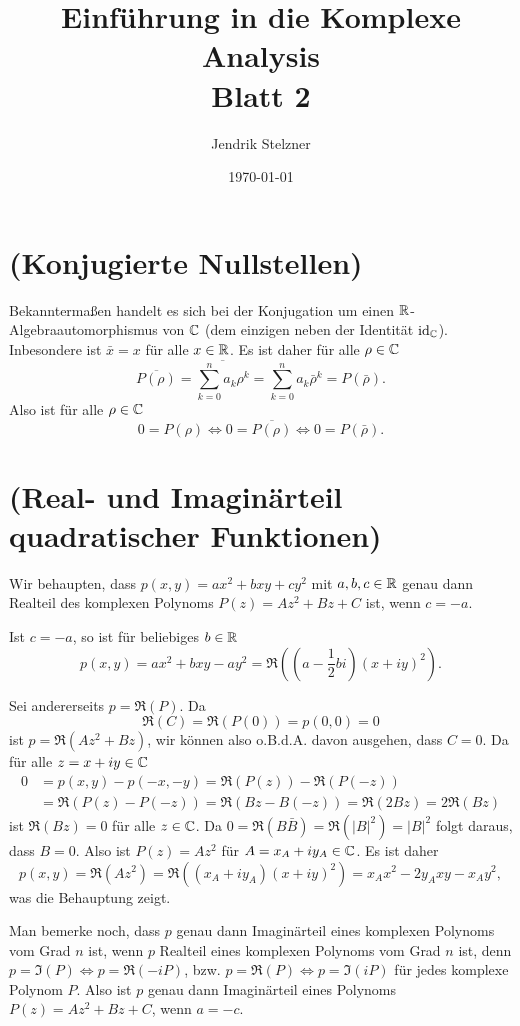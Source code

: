 \documentclass[a4paper,10pt]{article}
\title{\sc Einführung in die Komplexe Analysis \\ \Large Blatt 2}
\author{Jendrik Stelzner}
\date{\today}
\begin{document}
\maketitle





\section{(Konjugierte Nullstellen)}
Bekanntermaßen handelt es sich bei der Konjugation um einen $\mathbb{R}$-Algebraauto\-morph\-ismus von $\mathbb{C}$ (dem einzigen neben der Identität $\operatorname{id}_{\mathbb{C}}$). Inbesondere ist $\bar{x} = x$ für alle $x \in \mathbb{R}$. Es ist daher für alle $\rho \in \mathbb{C}$
\[
 \overline{P(\rho)} = \overline{\sum_{k=0}^n a_k \rho^k} = \sum_{k=0}^n a_k \bar{\rho}^k = P(\bar{\rho}).
\]
Also ist für alle $\rho \in \mathbb{C}$
\[
 0 = P(\rho) \Leftrightarrow 0 = \overline{P(\rho)} \Leftrightarrow 0 = P(\bar{\rho}).
\]





\addtocounter{section}{1}





\section{(Real- und Imaginärteil quadratischer Funktionen)}
Wir behaupten, dass $p(x,y) = ax^2 + bxy + cy^2$ mit $a,b,c \in \mathbb{R}$ genau dann Realteil des komplexen Polynoms $P(z) = Az^2 + Bz + C$ ist, wenn $c = -a$.

Ist $c = -a$, so ist für beliebiges $b \in \mathbb{R}$
\[
 p(x,y) = ax^2 + bxy - ay^2 = \Re\left(\left(a-\frac{1}{2}bi\right)(x+iy)^2\right).
\]

Sei andererseits $p = \Re(P)$. Da
\[
 \Re(C) = \Re(P(0)) = p(0,0) = 0
\]
ist $p = \Re(Az^2+Bz)$, wir können also o.B.d.A. davon ausgehen, dass $C=0$. Da für alle $z = x+iy \in \mathbb{C}$
\begin{align*}
 0 &= p(x,y) - p(-x,-y) = \Re(P(z))-\Re(P(-z)) \\
   &= \Re(P(z)-P(-z)) = \Re(Bz - B(-z)) = \Re(2Bz) = 2 \Re(Bz)
\end{align*}
ist $\Re(Bz) = 0$ für alle $z \in \mathbb{C}$. Da $0 = \Re(B \bar{B}) = \Re(|B|^2)= |B|^2$ folgt daraus, dass $B = 0$. Also ist $P(z) = Az^2$ für $A = x_A + iy_A \in \mathbb{C}$. Es ist daher
\[
 p(x,y) = \Re(Az^2) = \Re((x_A+iy_A)(x+iy)^2) = x_Ax^2 - 2y_Axy - x_A y^2,
\]
was die Behauptung zeigt.

Man bemerke noch, dass $p$ genau dann Imaginärteil eines komplexen Polynoms vom Grad $n$ ist, wenn $p$ Realteil eines komplexen Polynoms vom Grad $n$ ist, denn $p = \Im(P) \Leftrightarrow p = \Re(-iP)$, bzw. $p = \Re(P) \Leftrightarrow p = \Im(iP)$ für jedes komplexe Polynom $P$. Also ist $p$ genau dann Imaginärteil eines Polynoms $P(z) = Az^2+Bz+C$, wenn $a = -c$.
\end{document}
